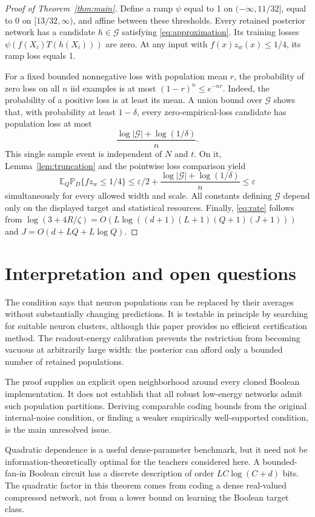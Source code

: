 \documentclass[11pt]{article}
\newcommand{\E}{\mathbb E}
\newcommand{\Prb}{\mathbb P}
\begin{document}
\begin{proof}[Proof of Theorem~\ref{thm:main}]
Define a ramp $\psi$ equal to 1 on $(-\infty,11/32]$, equal to 0 on
$[13/32,\infty)$, and affine between these thresholds. Every retained
posterior network has a candidate $h\in\mathcal G$ satisfying
\eqref{eq:approximation}. Its training losses
$\psi(f(X_i)T(h(X_i)))$ are zero. At any input with
$f(x)z_w(x)\le1/4$, its ramp loss equals 1.

For a fixed bounded nonnegative loss with population mean $r$, the
probability of zero loss on all $n$ iid examples is at most
$(1-r)^n\le e^{-nr}$. Indeed, the probability of a positive loss is at
least its mean. A union bound over $\mathcal G$ shows that, with probability
at least $1-\delta$, every zero-empirical-loss candidate has population
loss at most
\[
 \frac{\log|\mathcal G|+\log(1/\delta)}{n}.
\]
This single sample event is independent of $N$ and $t$. On it,
Lemma~\ref{lem:truncation} and the pointwise loss comparison yield
\[
 \E_Q\Prb_D\{fz_w\le1/4\}
 \le\varepsilon/2+
       \frac{\log|\mathcal G|+\log(1/\delta)}{n}
 \le\varepsilon
\]
simultaneously for every allowed width and scale. All constants defining
$\mathcal G$ depend only on the displayed target and statistical resources.
Finally, \eqref{eq:rate} follows from
$\log(3+4R/\zeta)=O(L\log((d+1)(L+1)(Q+1)(J+1)))$ and
$J=O(d+LQ+L\log Q)$.
\end{proof}

\section{Interpretation and open questions}

The condition says that neuron populations can be replaced by their
averages without substantially changing predictions. It is testable in
principle by searching for suitable neuron clusters, although this paper
provides no efficient certification method. The readout-energy calibration
prevents the restriction from becoming vacuous at arbitrarily large width:
the posterior can afford only a bounded number of retained populations.

The proof supplies an explicit open neighborhood around every cloned
Boolean implementation. It does not establish that all robust low-energy
networks admit such population partitions. Deriving comparable coding bounds
from the original internal-noise condition, or finding a weaker empirically
well-supported condition, is the main unresolved issue.

Quadratic dependence is a useful dense-parameter benchmark, but it need
not be information-theoretically optimal for the teachers considered here.
A bounded-fan-in Boolean circuit has a discrete description of order
$LC\log(C+d)$ bits. The quadratic factor in this theorem comes from coding
a dense real-valued compressed network, not from a lower bound on learning
the Boolean target class.
\end{document}
